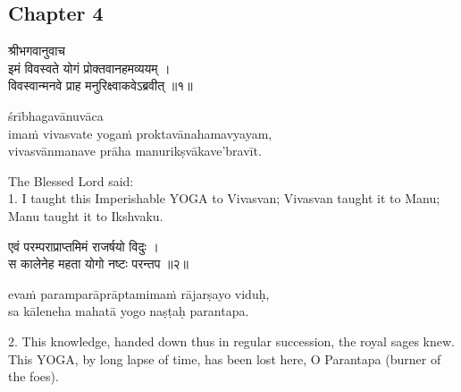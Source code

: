\chapterdrop

\begin{center}

\headerspace
{}

\section{Chapter 4}

\headerspace
{}

\headerspace
{}

\headerspace
{}

\headerspace
\end{center}

\begin{gitaverse}
श्रीभगवानुवाच \\
इमं विवस्वते योगं प्रोक्तवानहमव्ययम् । \\
विवस्वान्मनवे प्राह मनुरिक्ष्वाकवेऽब्रवीत् ॥१॥
\end{gitaverse}

\begin{transliteration}
śrībhagavānuvāca \\
imaṁ vivasvate yogaṁ proktavānahamavyayam, \\
vivasvānmanave prāha manurikṣvākave'bravīt.
\end{transliteration}

The Blessed Lord said: \\
1. I taught this Imperishable YOGA to Vivasvan; Vivasvan taught it to Manu;
Manu taught it to Ikshvaku.

\begin{gitaverse}
एवं परम्पराप्राप्तमिमं राजर्षयो विदुः । \\
स कालेनेह महता योगो नष्टः परन्तप ॥२॥
\end{gitaverse}

\begin{transliteration}
evaṁ paramparāprāptamimaṁ rājarṣayo viduḥ, \\
sa kāleneha mahatā yogo naṣṭaḥ parantapa.
\end{transliteration}

2. This knowledge, handed down thus in regular succession, the royal sages
knew. This YOGA, by long lapse of time, has been lost here, O Parantapa (burner
of the foes).

